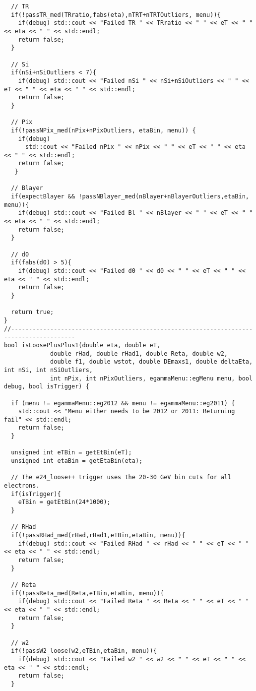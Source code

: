 \begin{lstlisting}
  // TR
  if(!passTR_med(TRratio,fabs(eta),nTRT+nTRTOutliers, menu)){
    if(debug) std::cout << "Failed TR " << TRratio << " " << eT << " " << eta << " " << std::endl;
    return false;
  }

  // Si
  if(nSi+nSiOutliers < 7){
    if(debug) std::cout << "Failed nSi " << nSi+nSiOutliers << " " << eT << " " << eta << " " << std::endl;
    return false;
  }

  // Pix
  if(!passNPix_med(nPix+nPixOutliers, etaBin, menu)) {
    if(debug)
      std::cout << "Failed nPix " << nPix << " " << eT << " " << eta << " " << std::endl;
    return false;
   }

  // Blayer
  if(expectBlayer && !passNBlayer_med(nBlayer+nBlayerOutliers,etaBin, menu)){
    if(debug) std::cout << "Failed Bl " << nBlayer << " " << eT << " " << eta << " " << std::endl;
    return false;
  }

  // d0
  if(fabs(d0) > 5){
    if(debug) std::cout << "Failed d0 " << d0 << " " << eT << " " << eta << " " << std::endl;
    return false;
  }

  return true;
}
//----------------------------------------------------------------------------------------
bool isLoosePlusPlus1(double eta, double eT,
		     double rHad, double rHad1, double Reta, double w2, 
		     double f1, double wstot, double DEmaxs1, double deltaEta, int nSi, int nSiOutliers, 
		     int nPix, int nPixOutliers, egammaMenu::egMenu menu, bool debug, bool isTrigger) {
  
  if (menu != egammaMenu::eg2012 && menu != egammaMenu::eg2011) {
    std::cout << "Menu either needs to be 2012 or 2011: Returning fail" << std::endl;
    return false; 
  } 

  unsigned int eTBin = getEtBin(eT);
  unsigned int etaBin = getEtaBin(eta);
  
  // The e24_loose++ trigger uses the 20-30 GeV bin cuts for all electrons. 
  if(isTrigger){
    eTBin = getEtBin(24*1000);
  }

  // RHad
  if(!passRHad_med(rHad,rHad1,eTBin,etaBin, menu)){
    if(debug) std::cout << "Failed RHad " << rHad << " " << eT << " " << eta << " " << std::endl;
    return false;
  }

  // Reta 
  if(!passReta_med(Reta,eTBin,etaBin, menu)){
    if(debug) std::cout << "Failed Reta " << Reta << " " << eT << " " << eta << " " << std::endl;
    return false;
  }

  // w2
  if(!passW2_loose(w2,eTBin,etaBin, menu)){
    if(debug) std::cout << "Failed w2 " << w2 << " " << eT << " " << eta << " " << std::endl;
    return false;
  }


\end{lstlisting}
